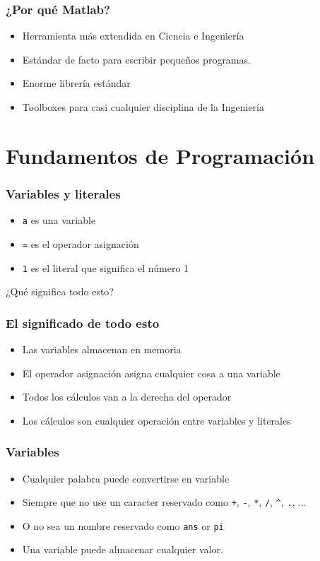 \documentclass[12pt]{beamer}
\begin{document}
\begin{frame}
  \frametitle{¿Por qué Matlab?}

  \begin{itemize}
  \item Herramienta más extendida en Ciencia e Ingeniería
  \item Estándar de facto para escribir pequeños programas.
  \item Enorme librería estándar
  \item Toolboxes para casi cualquier disciplina de la Ingeniería
  \end{itemize}

\end{frame}

\section{Fundamentos de Programación}

\begin{frame}
  \frametitle{Variables y literales}
\testcode
\begin{itemize}
\item \texttt{a} es una variable
\item \texttt{=} es el operador asignación
\item \texttt{1} es el literal que significa el número 1
\end{itemize}
\begin{center}
  ¿Qué significa todo esto?
\end{center}
\end{frame}

\begin{frame}
  \frametitle{El significado de todo esto}
  \begin{itemize}
  \item Las variables almacenan en memoria
  \item El operador asignación asigna cualquier cosa a una variable
  \item Todos los cálculos van a la derecha del operador
  \item Los cálculos son cualquier operación entre variables y literales
  \end{itemize}
\end{frame}

\begin{frame}
  \frametitle{Variables}
  \begin{itemize}
  \item Cualquier palabra puede convertirse en variable
  \item Siempre que no use un caracter reservado como \texttt{+},
    \texttt{-}, \texttt{*}, \texttt{/}, \texttt{\^}, \texttt{.}, ...
  \item O no sea un nombre reservado como \texttt{ans} or \texttt{pi}
  \item Una variable puede almacenar cualquier valor.
  \end{itemize}
\end{frame}
\end{document}
